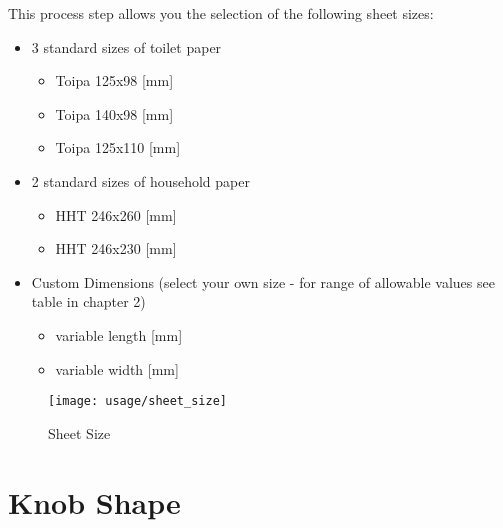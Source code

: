 This process step allows you the selection of the following sheet sizes:

\begin{itemize}
\item 3 standard sizes of toilet paper
	\begin{itemize}
   	\item Toipa 125x98 [mm] 
  	\item Toipa 140x98 [mm]
	\item Toipa 125x110 [mm]
	\end{itemize}
\item 2 standard sizes of household paper	
	\begin{itemize}
   	\item HHT 246x260 [mm]
  	\item HHT 246x230 [mm]
	\end{itemize}
\item Custom Dimensions (select your own size - for range of allowable values see table in chapter 2)
	\begin{itemize}
   	\item variable length [mm]
  	\item variable width [mm]
	\end{itemize}
\end{itemize}

\begin{figure}[!Hhtp]
  \begin{center}
   \texttt{[image: usage/sheet\_size]}
   \caption{Sheet Size}
  \end{center}
\end{figure}
\clearpage

\section{Knob Shape}

